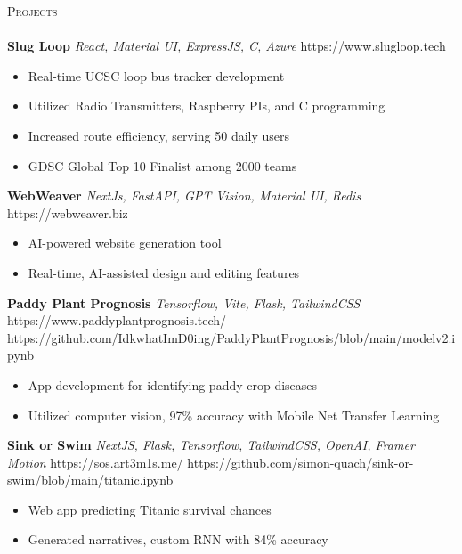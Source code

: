 \documentclass[a4paper]{article}
\newcommand{\lineunder} {
    \vspace*{-8pt} \\
    \hspace*{-18pt} \hrulefill \\
}
\newcommand{\header} [1] {
    {\hspace*{-18pt}\vspace*{6pt} \textsc{#1}}
    \vspace*{-6pt} \lineunder
}
\begin{document}
\header{Projects}
    {\textbf{Slug Loop}} {\sl React, Material UI, ExpressJS, C, Azure} \hfill https://www.slugloop.tech\\
        \vspace{-1mm}
\begin{itemize} \itemsep 1pt
  \item Real-time UCSC loop bus tracker development
  \item Utilized Radio Transmitters, Raspberry PIs, and C programming
  \item Increased route efficiency, serving 50 daily users
  \item GDSC Global Top 10 Finalist among 2000 teams
\end{itemize}
        \vspace*{2mm}
    {\textbf{WebWeaver}} {\sl NextJs, FastAPI, GPT Vision, Material UI, Redis} \hfill https://webweaver.biz\\
        \vspace{-1mm}
\begin{itemize} \itemsep 1pt
  \item AI-powered website generation tool
  \item Real-time, AI-assisted design and editing features
\end{itemize}
        \vspace*{2mm}
    {\textbf{Paddy Plant Prognosis}} {\sl Tensorflow, Vite, Flask, TailwindCSS} \hfill https://www.paddyplantprognosis.tech/ https://github.com/IdkwhatImD0ing/PaddyPlantPrognosis/blob/main/modelv2.ipynb\\
        \vspace{-1mm}
\begin{itemize} \itemsep 1pt
  \item App development for identifying paddy crop diseases
  \item Utilized computer vision, 97\% accuracy with Mobile Net Transfer Learning
\end{itemize}
        \vspace*{2mm}
    {\textbf{Sink or Swim}} {\sl NextJS, Flask, Tensorflow, TailwindCSS, OpenAI, Framer Motion} \hfill https://sos.art3m1s.me/ https://github.com/simon-quach/sink-or-swim/blob/main/titanic.ipynb\\
        \vspace{-1mm}
\begin{itemize} \itemsep 1pt
  \item Web app predicting Titanic survival chances
  \item Generated narratives, custom RNN with 84\% accuracy
\end{itemize}
\end{document}
